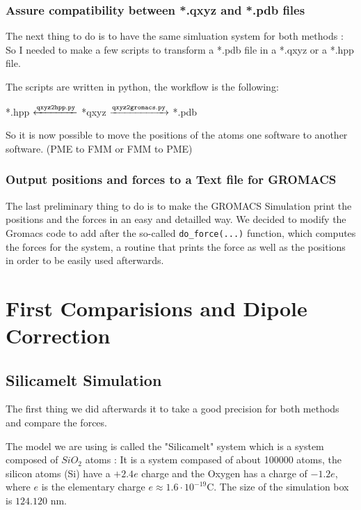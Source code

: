 \documentclass[12pt,twoside,a4paper]{report}
\begin{document}
\subsubsection{Assure compatibility between *.qxyz and *.pdb files}

The next thing to do is to have the same simluation system for both methods : So I needed to make a few scripts to transform a *.pdb file in a *.qxyz or a *.hpp file.

The scripts are written in python, the workflow is the following:

{
	\centering 
	{
	
	  *.hpp $\xleftarrow{\tt{qxyz2hpp.py}}$  *qxyz $\xrightarrow{\tt{qxyz2gromacs.py}}$ *.pdb	
	}
}

So it is now possible to move the positions of the atoms one software to another software. (PME to FMM or FMM to PME)

\subsubsection{Output positions and forces to a Text file for GROMACS}

The last preliminary thing to do is to make the GROMACS Simulation print the positions and the forces in an easy and detailled way. We decided to modify the Gromacs code to add after the so-called {\tt{do\_force(...)}} function, which computes the forces for the system, a routine that prints the force as well as the positions in order to be
 easily used afterwards. 

\section{First Comparisions and Dipole Correction}

\subsection{Silicamelt Simulation}

The first thing we did afterwards it to take a good precision for both methods and compare the forces.

The model we are using is called the "Silicamelt" system which is a system composed of $SiO_2$ atoms : It is a system compased of about 100000 atoms, the silicon atoms (Si) have a $+2.4e$ charge and the Oxygen has a charge of $-1.2e$, where $e$ is the elementary charge $e \approx 1.6\cdot10^{-19} \text{C}$.
The size of the simulation box is $124.120$ nm.
\end{document}
